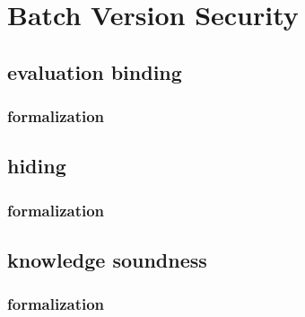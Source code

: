 \chapter{Batch Version Security}\label{chapter:batch_security}

\section{evaluation binding}

\subsection{formalization}

\section{hiding}

\subsection{formalization}

\section{knowledge soundness}

\subsection{formalization}